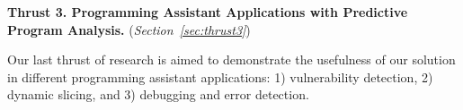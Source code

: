 \vspace{3pt}
\noindent \textbf{Thrust 3. Programming Assistant Applications with Predictive Program Analysis.}  ({\em Section~\ref{sec:thrust3}})


Our last thrust of research is aimed to demonstrate the usefulness of
our solution in different programming assistant applications: 1)
vulnerability detection, 2) dynamic slicing, and 3) debugging and
error detection.











